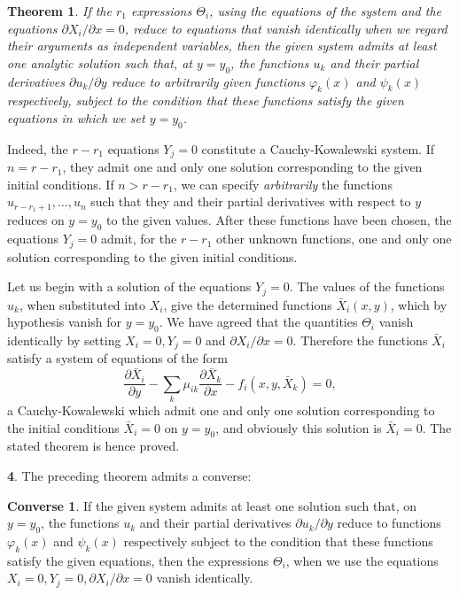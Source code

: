 \documentclass[leqno,11pt]{article}
\newcommand{\pd}{\partial}
\theoremstyle{shape1}
\newtheorem*{thm*}{\hspace{15pt}Theorem}
\theoremstyle{shape0}
\theoremstyle{shape2}
\theoremstyle{definition}
\begin{document}
\begin{thm*}
  If the $r_{1}$ expressions $\Theta_{i}$, using the equations of the system and the equations $\pd X_{i}/\pd x=0$, reduce to equations that vanish identically when we regard their arguments as independent variables, then the given system admits at least one analytic solution such that, at $y=y_{0}$, the functions $u_{k}$ and their partial derivatives $\pd u_{k}/\pd y$ reduce to arbitrarily given functions $\varphi_{k}(x)$ and $\psi_{k}(x)$ respectively, subject to the condition that these functions satisfy the given equations in which we set $y=y_{0}$.
\end{thm*}

Indeed, the $r-r_{1}$ equations $Y_{j}=0$ constitute a Cauchy-Kowalewski system. If $n=r-r_{1}$, they admit one and only one solution corresponding to the given initial conditions. If $n>r-r_{1}$, we can specify \emph{arbitrarily} the functions $u_{r-r_{1}+1},\dots,u_{n}$ such that they and their partial derivatives with respect to $y$ reduces on $y=y_{0}$ to the given values. After these functions have been chosen, the equations $Y_{j}=0$ admit, for the $r-r_{1}$ other unknown functions, one and only one solution corresponding to the given initial conditions.

Let us begin with a solution of the equations $Y_{j}=0$. The values of the functions $u_{k}$, when substituted into $X_{i}$, give the determined functions $\bar X_{i}(x,y)$, which by hypothesis vanish for $y=y_{0}$. We have agreed that the quantities $\Theta_{i}$ vanish identically  by setting $X_{i}=0,Y_{j}=0$ and $\pd X_{i}/\pd x=0$. Therefore the functions $\bar X_{i}$ satisfy a system of equations of the form
\[
\frac{\pd \bar X_{i}}{\pd y}-\sum_{k}\mu_{ik}\frac{\pd \bar X_{k}}{\pd x}-f_{i}(x,y,\bar X_{k})=0,
\]
a Cauchy-Kowalewski which admit one and only one solution corresponding to the initial conditions $\bar X_{i}=0$ on $y=y_{0}$, and obviously this solution is $\bar X_{i}=0$. The stated theorem is hence proved.

\vspace{12pt}

\textbf{4}. The preceding theorem admits a converse:

\theoremstyle{shape1}
\newtheorem*{thmc}{\hspace{15pt}Converse}
\begin{thmc}
  If the given system admits at least one solution such that, on $y=y_{0}$, the functions $u_{k}$ and their partial derivatives $\pd u_{k}/\pd y$ reduce to functions $\varphi_{k}(x)$ and $\psi_{k}(x)$ respectively subject to the condition that these functions satisfy the given equations, then the expressions $\Theta_{i}$, when we use the equations $X_{i}=0, Y_{j}=0, \pd X_{i}/\pd x=0$ vanish identically.
\end{thmc}
\end{document}
